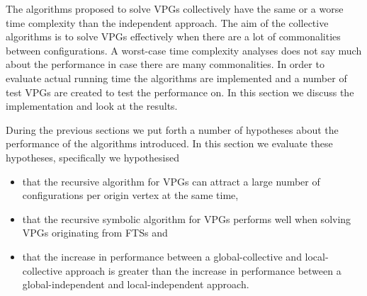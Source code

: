 The algorithms proposed to solve VPGs collectively have the same or a worse time complexity than the independent approach. The aim of the collective algorithms is to solve VPGs effectively when there are a lot of commonalities between configurations. A worst-case time complexity analyses does not say much about the performance in case there are many commonalities. In order to evaluate actual running time the algorithms are implemented and a number of test VPGs are created to test the performance on. In this section we discuss the implementation and look at the results.

During the previous sections we put forth a number of hypotheses about the performance of the algorithms introduced. In this section we evaluate these hypotheses, specifically we hypothesised
\begin{itemize}
	\item that the recursive algorithm for VPGs can attract a large number of configurations per origin vertex at the same time,
	\item that the recursive symbolic algorithm for VPGs performs well when solving VPGs originating from FTSs and
	\item that the increase in performance between a global-collective and local-collective approach is greater than the increase in performance between a global-independent and local-independent approach.
\end{itemize}